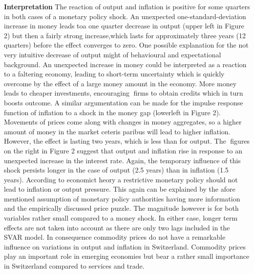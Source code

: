\documentclass[11pt,a4paper]{report}
\begin{document}
\newline\textbf{Interpretation}
\newline
The reaction of output and inflation is positive for some quarters in both cases of a monetary policy shock.  An unexpected one-standard-deviation increase in money leads toa one quarter decrease in output (upper left in Figure 2) but then a fairly strong increase,which lasts for approximately three years (12 quarters) before the effect converges to zero. One possible explanation for the not very intuitive decrease of output might of behavioural and expectational background.  An unexpected increase in money could be interpreted as a reaction to a faltering economy, leading to short-term uncertainty which is quickly overcome by the effect of a large money amount in the economy.  More money leads to cheaper investments, encouraging firms to obtain credits which in turn boosts outcome.  A similar argumentation can be made for the impulse response function of inflation to a shock in the money gap (lowerleft in Figure 2).  Movements of prices come along with changes in money aggregates,  so a higher amount of money in the market ceteris paribus will lead to higher inflation.  However, the effect is lasting two years, which is less than for output. The figures on the right in Figure 2 suggest that output and inflation rise in response to an unexpected increase in the interest rate.  Again, the temporary influence of this shock persists longer in the case of output (2.5 years) than in inflation (1.5 years).  According to economict heory  a  restrictive  monetary  policy  should  not  lead  to  inflation  or  output  pressure.   This again  can  be  explained  by  the  afore  mentioned  assumption  of  monetary  policy  authorities having more information and the empirically discussed price puzzle. The magnitude however is for both variables rather small compared to a money shock.  In either case, longer term effects are not taken into account as there are only two lags included in the SVAR model. In consequence commodity prices do not have a remarkable influence on variations in output and inflation in Switzerland.  Commodity prices play an important role in emerging economies but bear a rather small importance in Switzerland compared to services and trade.
\end{document}
